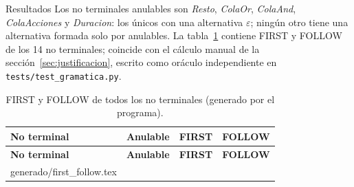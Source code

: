 \documentclass[11pt,letterpaper]{article}
\makeatletter
\renewcommand\subsection{\@startsection{subsection}{2}{\z@}{-2.6ex\@plus -1ex \@minus -.2ex}{1.0ex \@plus .2ex}%
  {\normalfont\large\bfseries}}
\newcommand{\filas}[1]{\@@input #1 }
\newcommand{\ruta}[1]{\nolinkurl{#1}}
\newcommand{\NT}[1]{\textit{#1}}
\newcommand{\eps}{\ensuremath{\varepsilon}}
\newcommand{\cabeza}{\rowcolor{cabecera}}
\newcommand{\archivopeq}[1]{\begingroup\footnotesize\endgroup}
\makeatother
\begin{document}
\archivopeq{generado/extracto_first_follow.txt}

\subsection{Resultados}
Los no terminales anulables son \NT{Resto}, \NT{ColaOr}, \NT{ColaAnd}, \NT{ColaAcciones} y \NT{Duracion}:
los únicos con una alternativa \eps; ningún otro tiene una alternativa formada solo por anulables. La
tabla~\ref{tab:firstfollow} contiene FIRST y FOLLOW de los 14 no terminales; coincide con el cálculo manual de
la sección~\ref{sec:justificacion}, escrito como oráculo independiente en \ruta{tests/test_gramatica.py}.

\begin{longtable}{>{\raggedright}p{2.6cm}p{1.7cm}>{\raggedright}p{4.6cm}>{\raggedright\arraybackslash}p{6.1cm}}
\caption{FIRST y FOLLOW de todos los no terminales (generado por el programa).}\label{tab:firstfollow}\\
\hline\cabeza \textbf{No terminal} & \textbf{Anulable} & \textbf{FIRST} & \textbf{FOLLOW}\\\hline\endfirsthead
\hline\cabeza \textbf{No terminal} & \textbf{Anulable} & \textbf{FIRST} & \textbf{FOLLOW}\\\hline\endhead
\filas{generado/first_follow.tex}
\hline
\end{longtable}
\end{document}
